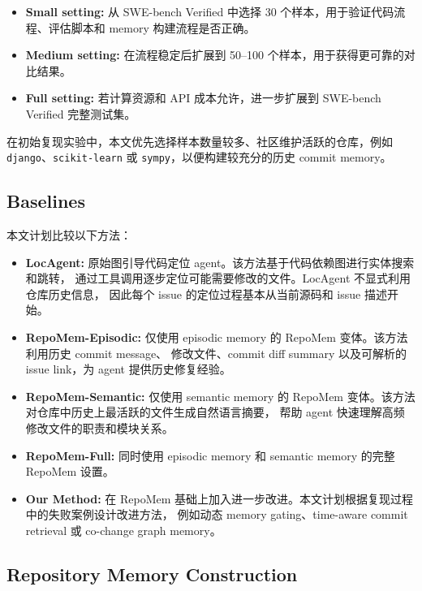 \documentclass[11pt]{article}
\begin{document}
\begin{itemize}
    \item \textbf{Small setting:} 从 SWE-bench Verified 中选择 30 个样本，用于验证代码流程、评估脚本和 memory 构建流程是否正确。
    \item \textbf{Medium setting:} 在流程稳定后扩展到 50--100 个样本，用于获得更可靠的对比结果。
    \item \textbf{Full setting:} 若计算资源和 API 成本允许，进一步扩展到 SWE-bench Verified 完整测试集。
\end{itemize}

在初始复现实验中，本文优先选择样本数量较多、社区维护活跃的仓库，例如
\texttt{django}、\texttt{scikit-learn} 或 \texttt{sympy}，以便构建较充分的历史 commit memory。

\subsection{Baselines}
\label{subsec:baselines}

本文计划比较以下方法：

\begin{itemize}
    \item \textbf{LocAgent:}
    原始图引导代码定位 agent。该方法基于代码依赖图进行实体搜索和跳转，
    通过工具调用逐步定位可能需要修改的文件。LocAgent 不显式利用仓库历史信息，
    因此每个 issue 的定位过程基本从当前源码和 issue 描述开始。

    \item \textbf{RepoMem-Episodic:}
    仅使用 episodic memory 的 RepoMem 变体。该方法利用历史 commit message、
    修改文件、commit diff summary 以及可解析的 issue link，为 agent 提供历史修复经验。

    \item \textbf{RepoMem-Semantic:}
    仅使用 semantic memory 的 RepoMem 变体。该方法对仓库中历史上最活跃的文件生成自然语言摘要，
    帮助 agent 快速理解高频修改文件的职责和模块关系。

    \item \textbf{RepoMem-Full:}
    同时使用 episodic memory 和 semantic memory 的完整 RepoMem 设置。

    \item \textbf{Our Method:}
    在 RepoMem 基础上加入进一步改进。本文计划根据复现过程中的失败案例设计改进方法，
    例如动态 memory gating、time-aware commit retrieval 或 co-change graph memory。
\end{itemize}

\subsection{Repository Memory Construction}
\label{subsec:memory_construction}
\end{document}
